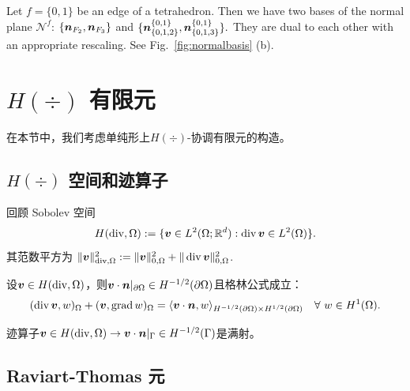 \begin{example}\rm
 Let $f = \{0,1\}$ be an edge of a tetrahedron. Then we have two bases of the normal plane $\mathscr N^f$: $\{\boldsymbol n_{F_2}, \boldsymbol n_{F_3}\}$ and $\{ \boldsymbol n^{\{0,1\}}_{\{0,1,2\}}, \boldsymbol n^{\{0,1\}}_{\{0,1,3\}}\}.$ They are dual to each other with an appropriate rescaling. See Fig.~\ref{fig:normalbasis} (b). 
\end{example}


\section{$H(\div)$ 有限元}
在本节中，我们考虑单纯形上$H(\div)$-协调有限元的构造。

\subsection{$H(\div)$ 空间和迹算子}
回顾 Sobolev 空间
\[
H(\operatorname{div},\Omega):=\{\boldsymbol v\in L^2(\Omega;\mathbb R^d): \operatorname{div}\boldsymbol v\in L^2(\Omega)\}.
\]
其范数平方为 $\|\boldsymbol v\|_{\operatorname{div}, \Omega}^2:=\|\boldsymbol v\|_{0, \Omega}^2+\|\operatorname{div}\boldsymbol v\|_{0, \Omega}^2$.
\begin{lemma}
设$\boldsymbol v\in H(\operatorname{div},\Omega)$，则$\boldsymbol v\cdot\boldsymbol n|_{\partial\Omega}\in H^{-1/2}(\partial\Omega)$且格林公式成立：
\[
(\operatorname{div}\boldsymbol v, w)_{\Omega} + (\boldsymbol v, \operatorname{grad} w)_{\Omega}=\langle\boldsymbol v\cdot\boldsymbol n, w\rangle_{H^{-1/2}(\partial\Omega)\times H^{1/2}(\partial\Omega)}\quad\forall~w\in H^1(\Omega).
\]
\end{lemma}

\begin{lemma}
迹算子$\boldsymbol v\in H(\operatorname{div},\Omega)\to\boldsymbol v\cdot\boldsymbol n|_{\Gamma}\in H^{-1/2}(\Gamma)$是满射。
\end{lemma}



\subsection{Raviart-Thomas 元}

